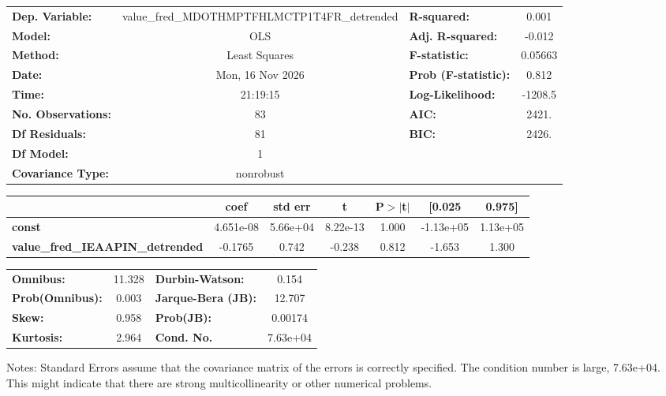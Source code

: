 \begin{center}
\begin{tabular}{lclc}
\toprule
\textbf{Dep. Variable:}                  & value\_fred\_MDOTHMPTFHLMCTP1T4FR\_detrended & \textbf{  R-squared:         } &     0.001   \\
\textbf{Model:}                          &                     OLS                      & \textbf{  Adj. R-squared:    } &    -0.012   \\
\textbf{Method:}                         &                Least Squares                 & \textbf{  F-statistic:       } &   0.05663   \\
\textbf{Date:}                           &               Mon, 16 Nov 2026               & \textbf{  Prob (F-statistic):} &    0.812    \\
\textbf{Time:}                           &                   21:19:15                   & \textbf{  Log-Likelihood:    } &   -1208.5   \\
\textbf{No. Observations:}               &                        83                    & \textbf{  AIC:               } &     2421.   \\
\textbf{Df Residuals:}                   &                        81                    & \textbf{  BIC:               } &     2426.   \\
\textbf{Df Model:}                       &                         1                    & \textbf{                     } &             \\
\textbf{Covariance Type:}                &                  nonrobust                   & \textbf{                     } &             \\
\bottomrule
\end{tabular}
\begin{tabular}{lcccccc}
                                         & \textbf{coef} & \textbf{std err} & \textbf{t} & \textbf{P$> |$t$|$} & \textbf{[0.025} & \textbf{0.975]}  \\
\midrule
\textbf{const}                           &    4.651e-08  &     5.66e+04     &  8.22e-13  &         1.000        &    -1.13e+05    &     1.13e+05     \\
\textbf{value\_fred\_IEAAPIN\_detrended} &      -0.1765  &        0.742     &    -0.238  &         0.812        &       -1.653    &        1.300     \\
\bottomrule
\end{tabular}
\begin{tabular}{lclc}
\textbf{Omnibus:}       & 11.328 & \textbf{  Durbin-Watson:     } &    0.154  \\
\textbf{Prob(Omnibus):} &  0.003 & \textbf{  Jarque-Bera (JB):  } &   12.707  \\
\textbf{Skew:}          &  0.958 & \textbf{  Prob(JB):          } &  0.00174  \\
\textbf{Kurtosis:}      &  2.964 & \textbf{  Cond. No.          } & 7.63e+04  \\
\bottomrule
\end{tabular}
\end{center}

Notes: \newline
 [1] Standard Errors assume that the covariance matrix of the errors is correctly specified. \newline
 [2] The condition number is large, 7.63e+04. This might indicate that there are \newline
 strong multicollinearity or other numerical problems.